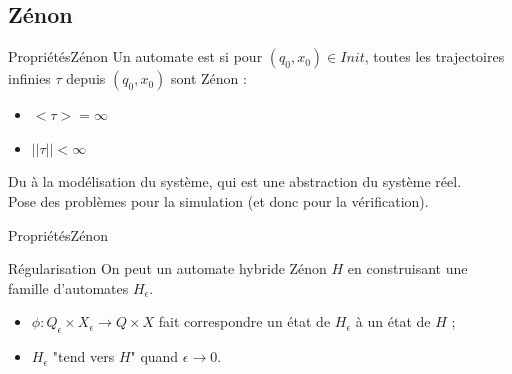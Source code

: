 \documentclass[compress]{beamer}
\begin{document}
\subsection{Zénon}
\begin{frame}{Propriétés}{Zénon}
Un automate est  si pour $(q_0, x_0) \in Init$, toutes les trajectoires infinies $\tau$ depuis $(q_0, x_0)$ sont Zénon :
\begin{itemize}
\item $<\tau> = \infty$
\item $||\tau|| < \infty$
\end{itemize}
\vspace{1cm}
Du à la modélisation du système, qui est une abstraction du système réel.\\
Pose des problèmes pour la simulation (et donc pour la vérification).
\end{frame}

\begin{frame}{Propriétés}{Zénon}
\begin{block}{Régularisation}
On peut  un automate hybride Zénon $H$ en construisant une famille d'automates $H_{\epsilon}$.
\begin{itemize}
\item $\phi : Q_{\epsilon} \times X_{\epsilon} \rightarrow Q \times X$ fait correspondre un état de $H_{\epsilon}$ à un état de $H$ ;
\item $H_{\epsilon}$ "tend vers $H$" quand $\epsilon \rightarrow 0$.
\end{itemize}
\end{block}
\end{frame}
\end{document}
